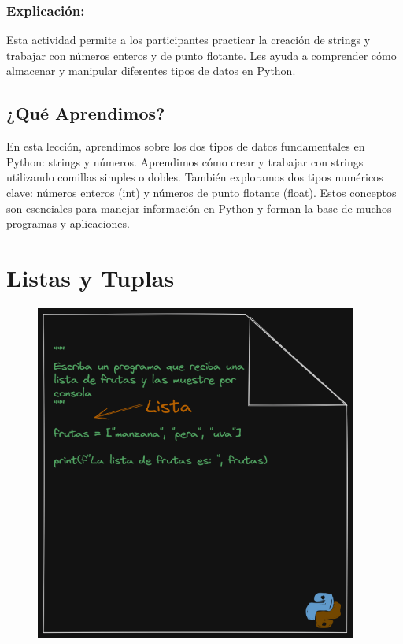 \documentclass[
  a4paper,
  DIV=11,
  numbers=noendperiod,
  onepage,
  openany]{scrreprt}
\begin{document}
\subsection{Explicación:}\label{explicaciuxf3n-6}

Esta actividad permite a los participantes practicar la creación de
strings y trabajar con números enteros y de punto flotante. Les ayuda a
comprender cómo almacenar y manipular diferentes tipos de datos en
Python.

\section{¿Qué Aprendimos?}\label{quuxe9-aprendimos-1}

En esta lección, aprendimos sobre los dos tipos de datos fundamentales
en Python: strings y números. Aprendimos cómo crear y trabajar con
strings utilizando comillas simples o dobles. También exploramos dos
tipos numéricos clave: números enteros (int) y números de punto flotante
(float). Estos conceptos son esenciales para manejar información en
Python y forman la base de muchos programas y aplicaciones.

\chapter{Listas y Tuplas}\label{listas-y-tuplas}

\begin{figure}

{\centering \includegraphics[width=4.16667in,height=\textheight]{unidades/unidad3/images/list.png}

}

\end{figure}
\end{document}
